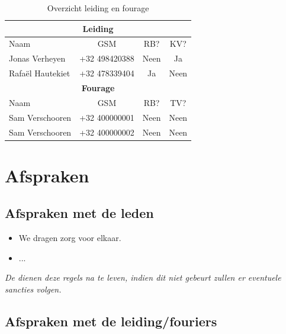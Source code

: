 \documentclass[fleqn,10pt]{src/KampSjabloon}
\begin{document}
\begin{table}[H]
\centering
\begin{tabularx}{8.5cm}{Xccc}
\toprule
\multicolumn{4}{c}{\textbf{Leiding}} \\
\midrule
Naam & GSM & RB?& KV? \\
\midrule

Jonas Verheyen & +32 498420388 & Neen & Ja \\
Rafaël Hautekiet & +32 478339404 & Ja & Neen \\

\midrule
\multicolumn{4}{c}{\textbf{Fourage}} \\
\midrule
Naam & GSM & RB? & TV? \\
\midrule

Sam Verschooren & +32 400000001 & Neen & Neen \\
Sam Verschooren & +32 400000002 & Neen & Neen \\

\bottomrule
\end{tabularx}
\caption{Overzicht leiding en fourage}
\end{table}


\section{Afspraken}

\subsection{Afspraken met de leden}

\begin{itemize}

\item We dragen zorg voor elkaar.
\item ...

\end{itemize}

\textit{De \Tak dienen deze regels na te leven, indien dit niet gebeurt zullen er eventuele sancties volgen.} %

\subsection{Afspraken met de leiding/fouriers}
\end{document}

